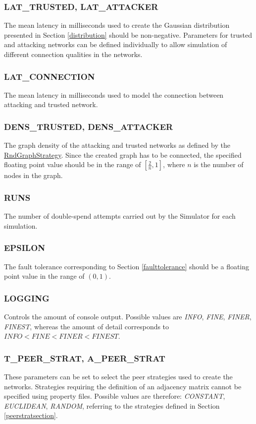 \documentclass[a4paper,12pt,twoside]{report}
\begin{document}
\subsubsection{LAT\_TRUSTED, LAT\_ATTACKER}
The mean latency in milliseconds used to create the Gaussian distribution presented in Section \ref{distribution} should be non-negative. Parameters for trusted and attacking networks can be defined individually to allow simulation of different connection qualities in the networks.
\subsubsection{LAT\_CONNECTION}
The mean latency in milliseconds used to model the connection between attacking and trusted network.
\subsubsection{DENS\_TRUSTED, DENS\_ATTACKER}
The graph density of the attacking and trusted networks as defined by the \hyperref[rndgraphstrategy]{RndGraphStrategy}. Since the created graph has to be connected, the specified floating point value should be in the range of $[\frac{2}{n}, 1]$, where $n$ is the number of nodes in the graph.
\subsubsection{RUNS}
The number of double-spend attempts carried out by the Simulator for each simulation.
\subsubsection{EPSILON}
The fault tolerance corresponding to Section \ref{faulttolerance} should be a floating point value in the range of $(0, 1)$.
\subsubsection{LOGGING}
Controls the amount of console output. Possible values are \textit{INFO}, \textit{FINE}, \textit{FINER}, \textit{FINEST}, whereas the amount of detail corresponds to $\textit{INFO} < \textit{FINE} < \textit{FINER} < \textit{FINEST}$.
\subsubsection{T\_PEER\_STRAT, A\_PEER\_STRAT}
These parameters can be set to select the peer strategies used to create the networks. Strategies requiring the definition of an adjacency matrix cannot be specified using property files. Possible values are therefore: \textit{CONSTANT}, \textit{EUCLIDEAN}, \textit{RANDOM}, referring to the strategies defined in Section \ref{peerstratsection}.
\end{document}
